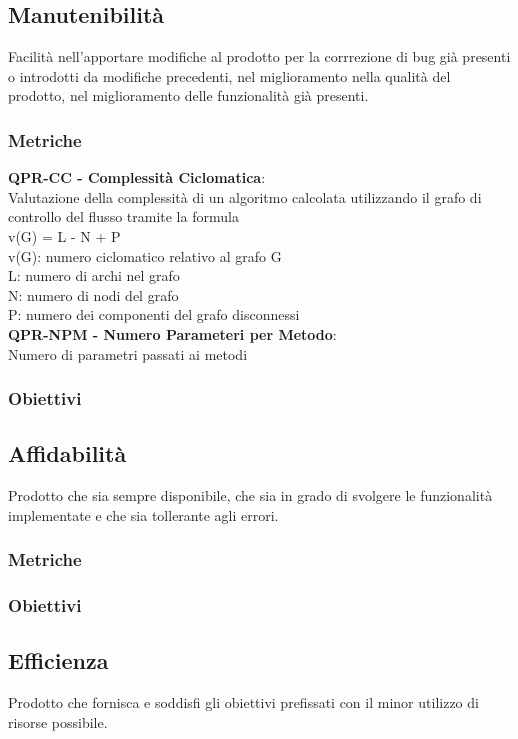 \subsection{Manutenibilità}
Facilità nell'apportare modifiche al prodotto per la corrrezione di bug già presenti o introdotti da modifiche precedenti,
nel miglioramento nella qualità del prodotto, nel miglioramento delle funzionalità già presenti.
\subsubsection{Metriche}
\textbf{QPR-CC - Complessità Ciclomatica}:\\
Valutazione della complessità di un algoritmo calcolata utilizzando il grafo di controllo del flusso tramite la formula\\
v(G) = L - N + P\\
v(G): numero ciclomatico relativo al grafo G \\
L: numero di archi nel grafo \\
N: numero di nodi del grafo \\
P: numero dei componenti del grafo disconnessi\\

\textbf{QPR-NPM - Numero Parameteri per Metodo}:\\ Numero di parametri passati ai metodi \\
\subsubsection{Obiettivi}

\subsection{Affidabilità}
Prodotto che sia sempre disponibile, che sia in grado di svolgere le funzionalità implementate e che sia tollerante agli errori.
\subsubsection{Metriche}
\subsubsection{Obiettivi}

\subsection{Efficienza}
Prodotto che fornisca e soddisfi gli obiettivi prefissati con il minor utilizzo di risorse possibile.
